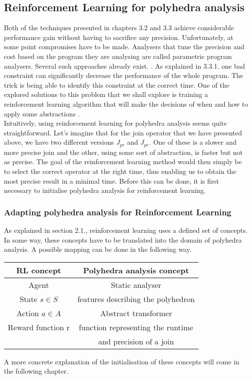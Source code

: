 \subsection{Reinforcement Learning for polyhedra analysis}
Both of the techniques presented in chapters 3.2 and 3.3 achieve considerable performance gain without having to sacrifice any precision. Unfortunately, at some point compromises have to be made. Analysers that tune the precision and cost based on the program they are analysing are called parametric program analysers. Several such approaches already exist. \cite{oh2015learning,liang2011learning,heo2016learning}.
As explained in 3.3.1. one bad constraint can significantly decrease the performance of the whole program. The trick is being able to identify this constraint at the correct time. One of the explored solutions to this problem that we shall explore is training a reinforcement learning algorithm  that will make the decisions of when and how to apply some abstractions \cite{singh2018fast}.\\
Intuitively, using reinforcement learning for polyhedra analysis seems quite straightforward. Let's imagine that for the join operator that we have presented above, we have two different versions $J_{pr}$ and $J_{pe}$. One of these is a slower and more precise join and the other, using some sort of abstraction, is faster but not as precise. The goal of the reinforcement learning method would then simply be to select the correct operator at the right time, thus enabling us to obtain the most precise result in a minimal time. Before this can be done, it is first necessary to initialise polyhedra analysis for reinforcement learning.

\subsubsection{Adapting polyhedra analysis for Reinforcement Learning}
As explained in section 2.1., reinforcement learning uses a defined set of concepts. In some way, these concepts have to be translated into the domain of polyhedra analysis. A possible mapping can be done in the following way.
\begin{center}
\begin{tabular}{||c c||} 
 \hline
 RL concept & Polyhedra analysis concept  \\ [0.5ex] 
 \hline
 \hline
 Agent & Static analyser\\ 

 State $s\in S$ & features describing the polyhedron\\

 Action $a \in A$ & Abstract transformer \\
 
 Reward function r & function representing the runtime\\
 
  & and precision of a join\\
 \hline
\end{tabular}
\end{center}
A more concrete explanation of the initialisation of these concepts will come in the following chapter.


